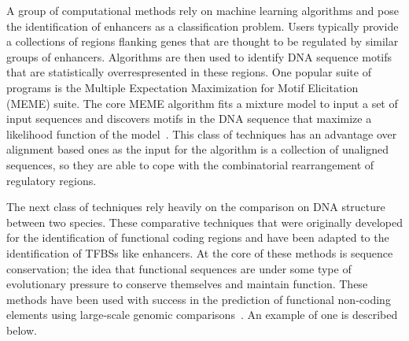 




        A group of computational methods rely on machine learning algorithms and pose the identification of enhancers as a classification problem. Users typically provide a collections of regions flanking genes that are thought to be regulated by similar groups of enhancers. Algorithms are then used to identify DNA sequence motifs that are statistically overrespresented in these regions. One popular suite of programs is the Multiple Expectation Maximization for Motif Elicitation (MEME) suite. The core MEME algorithm fits a mixture model to input a set of input sequences and discovers motifs in the DNA sequence that maximize a likelihood function of the model~\cite{bailey1994fitting}. This class of techniques has an advantage over alignment based ones as the input for the algorithm is a collection of unaligned sequences, so they are able to cope with the combinatorial rearrangement of regulatory regions. 
         
        The next class of techniques rely heavily on the comparison on DNA structure between two species.
        These comparative techniques that were originally developed for the identification of functional coding regions and have been adapted to the identification of TFBSs like enhancers. At the core of these methods is sequence conservation; the idea that functional sequences are under some type of evolutionary pressure to conserve themselves and maintain function. These methods have been used with success in the prediction of functional non-coding elements using large-scale genomic comparisons~\cite{aparicio2002whole, gottgens2000analysis, loots2000identification, mouse2002initial}. An example of one is described below.

